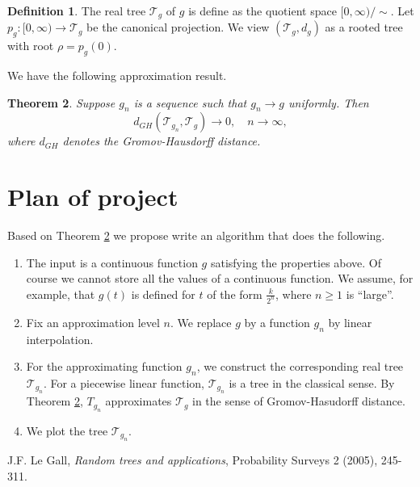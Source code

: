 \documentclass[12pt,oneside]{amsart}
\theoremstyle{plain}
\newtheorem{theorem}{Theorem}[section]
\theoremstyle{definition}
\newtheorem{definition}[theorem]{Definition}
\theoremstyle{remark}
\begin{document}
\begin{definition}
The real tree ${\mathcal T}_g$ of $g$ is define as the quotient space $[0, \infty) / \sim$. 
Let $p_g: [0, \infty) \rightarrow {\mathcal T}_g$ be the canonical projection. We view
$({\mathcal T}_g, d_g)$ as a rooted tree with root $\rho = p_g(0)$.
\end{definition}

We have the following approximation result.

\begin{theorem} \label{Thm 1}
Suppose $g_n$ is a sequence such that $g_n \rightarrow g$ uniformly. Then
\[
d_{GH}({\mathcal T}_{g_n}, {\mathcal T}_g) \rightarrow 0, \quad n \rightarrow \infty,
\]
where $d_{GH}$ denotes the Gromov-Hausdorff distance.
\end{theorem}

\section{Plan of project}
Based on Theorem \ref{Thm 1} we propose write an algorithm that does the following.

\begin{enumerate}
\item The input is a continuous function $g$ satisfying the properties above. Of course
we cannot store all the values of a continuous function. We assume, for example, that
$g(t)$ is defined for $t$ of the form $\frac{k}{2^n}$, where $n \geq 1$ is ``large''.
\item Fix an approximation level $n$. We replace $g$ by a function $g_n$ by linear
interpolation.
\item For the approximating function $g_n$, we construct the corresponding real tree ${\mathcal T}_{g_n}$.
For a piecewise linear function, ${\mathcal T}_{g_n}$ is a tree in the classical sense.
By Theorem \ref{Thm 1}, $T_{g_n}$ approximates ${\mathcal T}_g$ in the sense of 
Gromov-Hasudorff distance.
\item We plot the tree ${\mathcal T}_{g_n}$.
\end{enumerate}

\begin{thebibliography}{99}

     J.F. Le Gall, \emph{Random trees and applications},
     Probability Surveys 2 (2005), 245-311.
\end{thebibliography}

\end{document}

